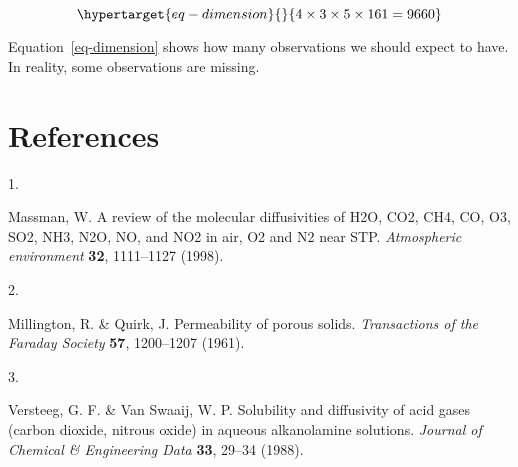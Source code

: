 \documentclass[
]{article}
\newlength{\cslhangindent}
\newlength{\csllabelwidth}
\newlength{\cslentryspacingunit} %
\newenvironment{CSLReferences}[2] %
 {%
  \setlength{\parindent}{0pt}
  \ifodd #1
  \let\oldpar\par
  \def\par{\hangindent=\cslhangindent\oldpar}
  \fi
  \setlength{\parskip}{#2\cslentryspacingunit}
 }%
 {}
\newcommand{\CSLLeftMargin}[1]{\parbox[t]{\csllabelwidth}{#1}}
\newcommand{\CSLRightInline}[1]{\parbox[t]{\linewidth - \csllabelwidth}{#1}\break}
\begin{document}
\begin{equation}\protect\hypertarget{eq-dimension}{}{4 \times 3 \times 5 \times 161 = 9660}\label{eq-dimension}\end{equation}

Equation~\ref{eq-dimension} shows how many observations we should expect
to have. In reality, some observations are missing.

\hypertarget{references}{%
\section*{References}\label{references}}

\hypertarget{refs}{}
\begin{CSLReferences}{0}{0}
\leavevmode{}%
\CSLLeftMargin{1. }%
\CSLRightInline{Massman, W. A review of the molecular diffusivities of
H2O, CO2, CH4, CO, O3, SO2, NH3, N2O, NO, and NO2 in air, O2 and N2 near
STP. \emph{Atmospheric environment} \textbf{32}, 1111--1127 (1998).}

\leavevmode{}%
\CSLLeftMargin{2. }%
\CSLRightInline{Millington, R. \& Quirk, J. Permeability of porous
solids. \emph{Transactions of the Faraday Society} \textbf{57},
1200--1207 (1961).}

\leavevmode{}%
\CSLLeftMargin{3. }%
\CSLRightInline{Versteeg, G. F. \& Van Swaaij, W. P. Solubility and
diffusivity of acid gases (carbon dioxide, nitrous oxide) in aqueous
alkanolamine solutions. \emph{Journal of Chemical \& Engineering Data}
\textbf{33}, 29--34 (1988).}

\end{CSLReferences}
\end{document}
